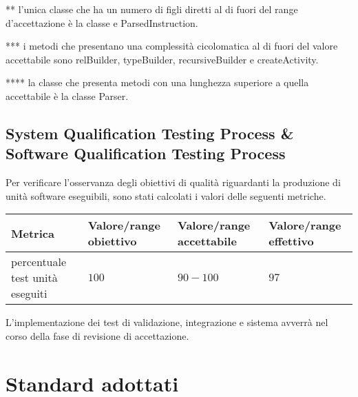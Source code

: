 	** l'unica classe che ha un numero di figli diretti al di fuori del range d'accettazione è la classe e ParsedInstruction.
	
	*** i metodi che presentano una complessità cicolomatica al di fuori del valore accettabile sono relBuilder, typeBuilder, recursiveBuilder e createActivity.
	
	**** la classe che presenta metodi con una lunghezza superiore a quella accettabile è la classe Parser.
	
	
	\subsection{System Qualification Testing Process \& Software Qualification Testing Process}
		Per verificare l'osservanza degli obiettivi di qualità riguardanti la produzione di unità software eseguibili, sono stati calcolati i valori delle seguenti metriche.
		
	\begin{center}
\begin{tabular}{| p{6cm} | p{2.5cm} | p{2.5cm} | p{2.5cm} |}
	\hline
	\textbf{Metrica} & \textbf{Valore/range obiettivo} & \textbf{Valore/range accettabile} & \textbf{Valore/range effettivo} \\
	\hline
	percentuale test unità eseguiti & $100$ & $90-100$ & $97$\\
	\hline
\end{tabular}
\end{center}
	
	L'implementazione dei test di validazione, integrazione e sistema avverrà nel corso della fase di revisione di accettazione.



\section{Standard adottati}
